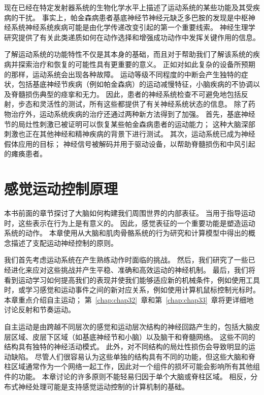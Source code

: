现在已经在特定发射器系统的生物化学水平上描述了运动系统的某些功能及其受疾病的干扰。
事实上，帕金森病患者基底神经节神经元缺乏多巴胺的发现是中枢神经系统神经系统疾病可能是由化学传递改变引起的第一个重要线索。
神经生理学研究提供了有关此类递质如何在动作选择和增强成功动作中发挥关键作用的信息。


了解运动系统的功能特性不仅是其本身的基础，而且对于帮助我们了解该系统的疾病并探索治疗和恢复的可能性具有更重要的意义。
正如对如此复杂的设备所预期的那样，运动系统会出现各种故障。
运动等级不同程度的中断会产生独特的症状，包括基底神经节疾病（例如帕金森病）的运动减慢特征，小脑疾病的不协调以及脊髓损伤典型的痉挛和无力。
因此，患者的神经系统检查不可避免地包括反射，步态和灵活性的测试，所有这些都提供了有关神经系统状态的信息。
除了药物治疗外，运动系统疾病的治疗还通过两种新方法得到了加强。
首先，基底神经节的局灶性刺激已被证明可以恢复某些帕金森病患者的运动能力；
这种大脑深部刺激也正在其他神经和精神疾病的背景下进行测试。
其次，运动系统已成为神经假体应用的目标；
神经信号被解码并用于驱动设备，以帮助脊髓损伤和中风引起的瘫痪患者。




\chapter{感觉运动控制原理} \label{chap:chap30}

本书前面的章节探讨了大脑如何构建我们周围世界的内部表征。
当用于指导运动时，这些表示在行为上是有意义的。
因此，感觉表征的一个重要功能是塑造运动系统的动作。 
本章使用从大脑和肌肉骨骼系统的行为研究和计算模型中得出的概念描述了支配运动神经控制的原则。


我们首先考虑运动系统在产生熟练动作时面临的挑战。
然后，我们研究了一些已经进化来应对这些挑战并产生平稳、准确和高效运动的神经机制。
最后，我们将看到运动学习如何提高我们的表现并使我们能够适应新的机械条件，例如使用工具时，或学习感觉和运动事件之间的新对应关系，例如使用计算机鼠标控制光标时。
本章重点介绍自主运动；
第~\ref{chap:chap32}~章和第~\ref{chap:chap33}~章将更详细地讨论反射和节奏运动。


自主运动是由跨越不同层次的感觉和运动层次结构的神经回路产生的，包括大脑皮层区域、皮层下区域（如基底神经节和小脑）以及脑干和脊髓网络。
这些不同的结构具有独特的神经活动模式。
此外，对不同结构的局灶性损伤会导致明显的运动缺陷。 
尽管人们很容易认为这些单独的结构具有不同的功能，但这些大脑和脊柱区域通常作为一个网络一起工作，因此对一个组件的损坏可能会影响所有其他组件的功能。
本章讨论的许多原则不能轻易归因于单个大脑或脊柱区域。
相反，分布式神经处理可能是支持感觉运动控制的计算机制的基础。



